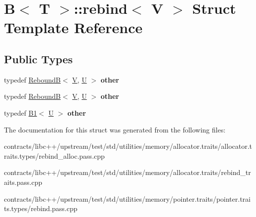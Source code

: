 \hypertarget{struct_b_1_1rebind}{}\section{B$<$ T $>$\+:\+:rebind$<$ V $>$ Struct Template Reference}
\label{struct_b_1_1rebind}
\subsection*{Public Types}
\begin{DoxyCompactItemize}
\item 
\mbox{\label{struct_b_1_1rebind_a78b5c789b29a0fa81309924eac19618f}} 
typedef \mbox{\hyperlink{struct_rebound_b}{ReboundB}}$<$ \mbox{\hyperlink{struct_v}{V}}, \mbox{\hyperlink{union_u}{U}} $>$ {\bfseries other}
\item 
\mbox{\label{struct_b_1_1rebind_a78b5c789b29a0fa81309924eac19618f}} 
typedef \mbox{\hyperlink{struct_rebound_b}{ReboundB}}$<$ \mbox{\hyperlink{struct_v}{V}}, \mbox{\hyperlink{union_u}{U}} $>$ {\bfseries other}
\item 
\mbox{\label{struct_b_1_1rebind_ae42820dcd508e7963846cde9f8e18692}} 
typedef \mbox{\hyperlink{struct_b1}{B1}}$<$ \mbox{\hyperlink{union_u}{U}} $>$ {\bfseries other}
\end{DoxyCompactItemize}


The documentation for this struct was generated from the following files\+:\begin{DoxyCompactItemize}
\item 
contracts/libc++/upstream/test/std/utilities/memory/allocator.\+traits/allocator.\+traits.\+types/rebind\+\_\+alloc.\+pass.\+cpp\item 
contracts/libc++/upstream/test/std/utilities/memory/allocator.\+traits/rebind\+\_\+traits.\+pass.\+cpp\item 
contracts/libc++/upstream/test/std/utilities/memory/pointer.\+traits/pointer.\+traits.\+types/rebind.\+pass.\+cpp\end{DoxyCompactItemize}
